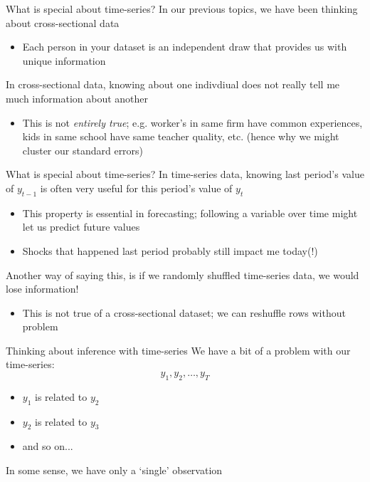 \documentclass[aspectratio=169,t,11pt,table]{beamer}
\begin{document}

\begin{frame}{What is special about time-series?}
  In our previous topics, we have been thinking about \alert{cross-sectional} data
  \begin{itemize}
    \item Each person in your dataset is an independent draw that provides us with unique information
  \end{itemize}

  \bigskip
  In cross-sectional data, knowing about one indivdiual does not really tell me much information about another
  \begin{itemize}
    \item This is not \emph{entirely true}; e.g. worker's in same firm have common experiences, kids in same school have same teacher quality, etc. (hence why we might cluster our standard errors)
  \end{itemize}
\end{frame}

\begin{frame}{What is special about time-series?}
  In time-series data, knowing last period's value of $y_{t-1}$ is often very useful for this period's value of $y_{t}$
  \begin{itemize}
    \item This property is essential in forecasting; following a variable over time might let us predict future values
    
    \item Shocks that happened last period probably still impact me today(!) 
  \end{itemize}

  \pause
  \bigskip
  Another way of saying this, is if we randomly shuffled time-series data, we would lose information!
  \begin{itemize}
    \item This is not true of a cross-sectional dataset; we can reshuffle rows without problem 
  \end{itemize}
\end{frame}


\begin{frame}{Thinking about inference with time-series}
  We have a bit of a problem with our time-series:
  $$
    y_1, y_2, \dots, y_T
  $$
  \vspace*{-\bigskipamount}
  \begin{itemize}
    \item $y_1$ is related to $y_2$ 
    \item $y_2$ is related to $y_3$
    \item and so on...
  \end{itemize}

  \bigskip
  In some sense, we have only a `single' observation 
\end{frame}
\end{document}
